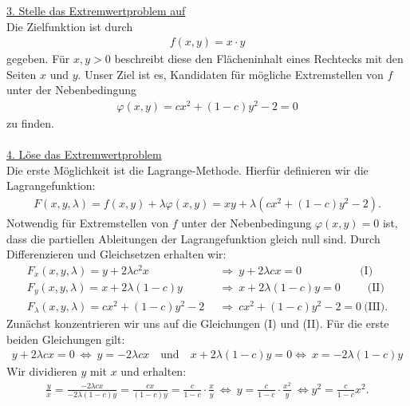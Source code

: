 \newpage
\underline{3. Stelle das Extremwertproblem auf}\\
Die Zielfunktion ist durch 
\begin{align*}
f(x,y) = x \cdot y
\end{align*}
gegeben. Für $ x,y > 0 $ beschreibt diese den Flächeninhalt eines Rechtecks mit den Seiten $ x $ und $ y $.
Unser Ziel ist es, Kandidaten für mögliche Extremstellen von $ f $ unter der Nebenbedingung
\begin{align*}
\varphi(x,y) = 
cx^2 +(1-c) y^2 -2 = 0
\end{align*}
zu finden.\\
\\
\underline{4. Löse das Extremwertproblem}\\
Die erste Möglichkeit ist die Lagrange-Methode. Hierfür definieren wir die Lagrangefunktion:
\begin{align*}
F(x,y, \lambda ) = f(x,y) + \lambda \varphi(x,y)
= xy + \lambda(c x^2 + (1-c)y^2 -2 ).
\end{align*}
Notwendig für Extremstellen von $ f $ unter der Nebenbedingung $ \varphi(x,y)= 0 $ ist, dass die partiellen Ableitungen der Lagrangefunktion gleich null sind.
Durch Differenzieren und Gleichsetzen erhalten wir:
\begin{align*}
F_x(x,y, \lambda) = y + 2\lambda  c^2 x \qquad \qquad \   &\ \Rightarrow \ y + 2\lambda  c x = 0  \ 
\qquad \qquad \quad  \textrm{(I)}\\
F_y(x,y,\lambda) = x + 2 \lambda (1-c) y \qquad \  &\ \Rightarrow \ x + 2 \lambda (1-c) y = 0\  \quad \quad \  \textrm{(II)}\\
F_\lambda(x,y,\lambda) = c x^2 +(1-c) y^2 -2 &\ \Rightarrow \  c x^2 +(1-c) y^2 -2= 0\  \textrm{(III)}.
\end{align*}
Zunächst konzentrieren wir uns auf die Gleichungen (I) und (II).
Für die erste beiden Gleichungen gilt:
\begin{align*}
y  + 2 \lambda c x = 0 \ \Leftrightarrow \
y = - 2 \lambda c x \quad \textrm{und} \quad 
x + 2 \lambda (1-c) y = 0  \Leftrightarrow \ x = - 2 \lambda (1-c) y
\end{align*}
Wir dividieren $ y $ mit $ x  $ und erhalten:
\begin{align*}
\frac{y}{x} = 
\frac{- 2 \lambda c x}{- 2 \lambda (1-c) y}
=
\frac{cx}{(1-c)y} = \frac{c}{1-c} \cdot \frac{x}{y}
\ \Leftrightarrow \
y = 
\frac{c}{1-c} \cdot \frac{x^2}{y}
\ \Leftrightarrow 
y^2 = \frac{c}{1-c} x^2.
\end{align*}
